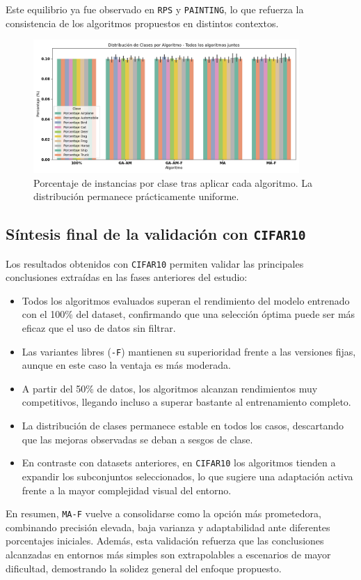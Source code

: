 Este equilibrio ya fue observado en \texttt{RPS} y \texttt{PAINTING}, lo que refuerza la consistencia de los algoritmos propuestos en distintos contextos.

\begin{figure}[htp]
    \centering
    \includegraphics[width=0.9\textwidth]{imagenes/evaluaciones/cifar10/balance-de-clases.png}
    \caption{
        Porcentaje de instancias por clase tras aplicar cada algoritmo.
        La distribución permanece prácticamente uniforme.
    }
    \label{fig:cifar10_balance}
\end{figure}

\subsection{Síntesis final de la validación con \texttt{CIFAR10}}
Los resultados obtenidos con \texttt{CIFAR10} permiten validar las principales conclusiones extraídas en las fases anteriores del estudio:

\begin{itemize}
    \item Todos los algoritmos evaluados superan el rendimiento del modelo entrenado con el 100\% del dataset,
          confirmando que una selección óptima puede ser más eficaz que el uso de datos sin filtrar.
    \item Las variantes libres (\texttt{-F}) mantienen su superioridad frente a las versiones fijas, aunque en este caso la ventaja es más moderada.
    \item A partir del 50\% de datos, los algoritmos alcanzan rendimientos muy competitivos, llegando incluso a superar bastante al entrenamiento completo.
    \item La distribución de clases permanece estable en todos los casos, descartando que las mejoras observadas se deban a sesgos de clase.
    \item En contraste con datasets anteriores, en \texttt{CIFAR10} los algoritmos tienden a expandir los subconjuntos seleccionados,
          lo que sugiere una adaptación activa frente a la mayor complejidad visual del entorno.
\end{itemize}

En resumen, \texttt{MA-F} vuelve a consolidarse como la opción más prometedora, combinando precisión elevada,
baja varianza y adaptabilidad ante diferentes porcentajes iniciales.
Además, esta validación refuerza que las conclusiones alcanzadas en entornos más simples son extrapolables a escenarios de mayor dificultad,
demostrando la solidez general del enfoque propuesto.
